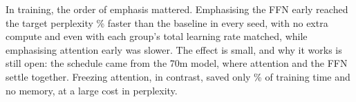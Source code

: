 \documentclass[11pt]{article}
\begin{document}
In training, the order of emphasis mattered. Emphasising the FFN early reached
the target perplexity \ASLStepsRelAbs\% faster than the baseline in every
seed, with no extra compute and even with each group's total learning rate
matched, while emphasising attention early was slower. The effect is small,
and why it works is still open: the schedule came from the 70m model, where
attention and the FFN settle together. Freezing attention, in contrast, saved
only \FrzWallRelAbs\% of training time and no memory, at a large cost in
perplexity.









\end{document}
